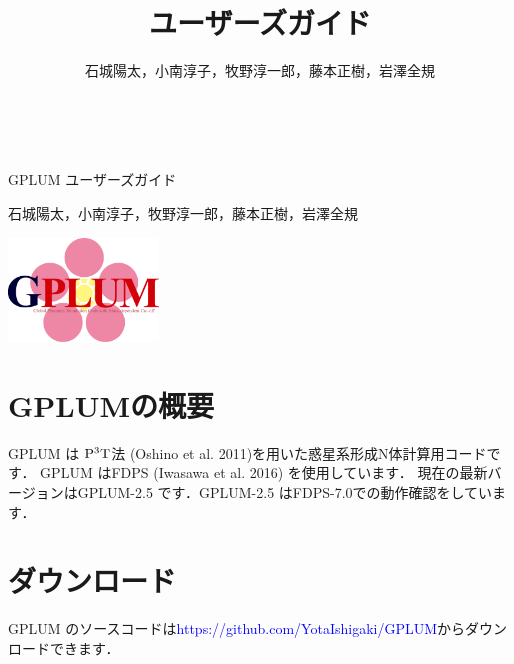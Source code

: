 \documentclass[12pt,a4paper,dvipdfmx]{jsarticle}
\title{\ourcode ユーザーズガイド}
\author{石城陽太，小南淳子，牧野淳一郎，藤本正樹，岩澤全規}
\newcommand{\ourcode}{GPLUM\xspace}
\newcommand{\ourcodeR}{GPLUM-2.5\xspace}
\begin{document}

　\vspace{5mm}

\begin{center}
\hspace{27mm} {\huge \ourcode ユーザーズガイド}

\vspace{7mm}

\hspace{39mm} {\large 石城陽太，小南淳子，牧野淳一郎，藤本正樹，岩澤全規}
\end{center}

\begin{flushleft}
\vspace{-27mm}
\hspace{1mm} \includegraphics[width=4cm]{GPLUM_logo.pdf}
\end{flushleft}

\vspace{15mm}


\tableofcontents



\newpage

\section{GPLUMの概要}

\ourcode は ${\rm P^{3}T}$法 (Oshino et al. 2011)を用いた惑星系形成N体計算用コードです．
\ourcode はFDPS (Iwasawa et al. 2016) を使用しています．
現在の最新バージョンは\ourcodeR です．\ourcodeR はFDPS-7.0での動作確認をしています．


\section{ダウンロード}
\ourcode のソースコードは\textcolor{blue}{https://github.com/YotaIshigaki/GPLUM}からダウンロードできます．
\end{document}
